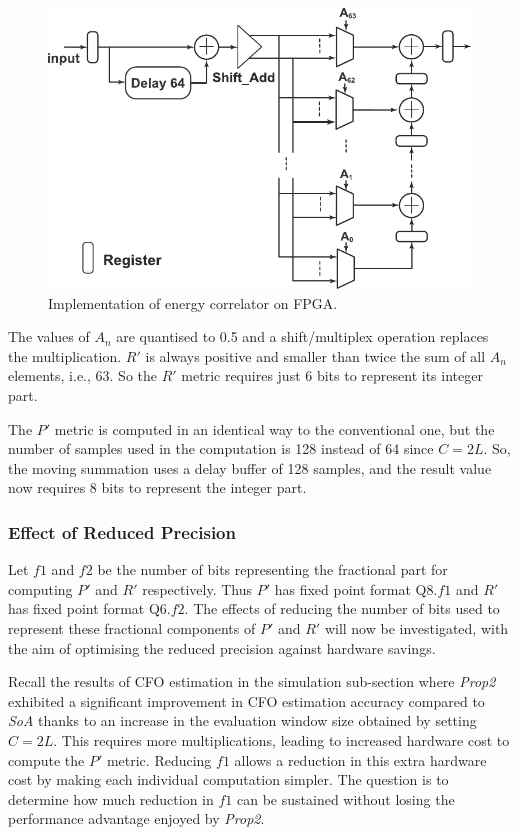 \begin{figure}[h]
	\centerline{\includegraphics [width=1\columnwidth] {figures/ML_Cor.pdf}}
	\caption{Implementation of energy correlator on FPGA.}
	\label{fig:ML-Cor}
\end{figure}

The values of $A_n$ are quantised to 0.5 and a shift/multiplex operation replaces the multiplication.
$R'$ is always positive and smaller than twice the sum of all $A_n$ elements, i.e., 63. So the $R'$ metric requires just 6 bits to represent its integer part.

The $P'$ metric is computed in an identical way to the conventional one, but the number of samples used in the computation is 128 instead of 64 since $C=2L$.
So, the moving summation uses a delay buffer of 128 samples, and the result value now requires 8 bits to represent the integer part.

\subsubsection{Effect of Reduced Precision}

Let $f1$ and $f2$ be the number of bits representing the fractional part for computing $P'$  and $R'$ respectively. Thus $P'$ has fixed point format Q8.$f1$ and $R'$ has fixed point format Q6.$f2$.
The effects of reducing the number of bits used to represent these fractional components of  $P'$  and $R'$  will now be investigated, with the aim of optimising the reduced precision against hardware savings.

Recall the results of CFO estimation in the simulation sub-section where \textit{Prop2} exhibited a significant improvement in CFO estimation accuracy compared to \textit{SoA} thanks to an increase in the evaluation window size obtained by setting $C=2L$. This requires more multiplications, leading to increased hardware cost to compute the $P'$ metric. Reducing $f1$ allows a reduction in this extra hardware cost by making each individual computation simpler. The question is to determine how much reduction in $f1$ can be sustained without losing the performance advantage enjoyed by \textit{Prop2}.

